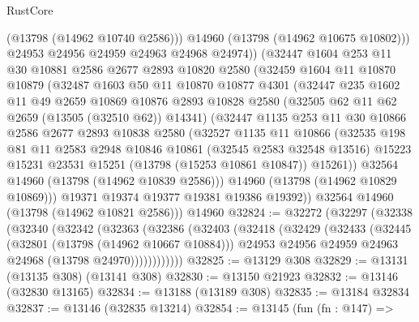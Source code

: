 \begin{lexlean}{RustCore}
\begin{coremodule}
            (@13798 (@14962 @10740 @2586)))
          @14960
          (@13798 (@14962 @10675 @10802)))
        @24953
        @24956
        @24959
        @24963
        @24968
        @24974))
    (@32447
      @1604
      @253
      @11
      @30
      @10881
      @2586
      @2677
      @2893
      @10820
      @2580
      (@32459
        @1604
        @11
        @10870
        @10879
        (@32487
          @1603
          @50
          @11
          @10870
          @10877
          @4301
          (@32447
            @235
            @1602
            @11
            @49
            @2659
            @10869
            @10876
            @2893
            @10828
            @2580
            (@32505 @62 @11 @62 @2659 (@13505 (@32510 @62)) @14341)
            (@32447
              @1135
              @253
              @11
              @30
              @10866
              @2586
              @2677
              @2893
              @10838
              @2580
              (@32527
                @1135
                @11
                @10866
                (@32535
                  @198
                  @81
                  @11
                  @2583
                  @2948
                  @10846
                  @10861
                  (@32545 @2583 @32548 @13516)
                  @15223
                  @15231
                  @23531
                  @15251
                  (@13798 (@15253 @10861 @10847))
                  @15261))
              @32564
              @14960
              (@13798 (@14962 @10839 @2586)))
            @14960
            (@13798 (@14962 @10829 @10869)))
          @19371
          @19374
          @19377
          @19381
          @19386
          @19392))
      @32564
      @14960
      (@13798 (@14962 @10821 @2586)))
    @14960
@32824 := @32272
    (@32297
      (@32338
        (@32340
          (@32342
            (@32363
              (@32386
                (@32403
                  (@32418
                    (@32429
                      (@32433
                        (@32445
                          (@32801 (@13798 (@14962 @10667 @10884)))
                          @24953
                          @24956
                          @24959
                          @24963
                          @24968
                          (@13798 @24970))))))))))))
@32825 := @13129 @308
@32829 := @13131 (@13135 @308) (@13141 @308)
@32830 := @13150 @21923
@32832 := @13146 (@32830 @13165)
@32834 := @13188 (@13189 @308)
@32835 := @13184 @32834
@32837 := @13146 (@32835 @13214)
@32854 := @13145
    (fun (fn : @147) =>

\end{coremodule}
\end{lexlean}
